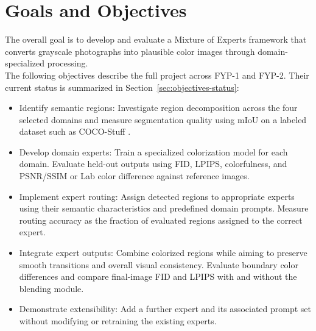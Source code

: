 \documentclass{FastFyp}
\begin{document}
\section{Goals and Objectives}
The overall goal is to develop and evaluate a Mixture of Experts framework that converts grayscale photographs into plausible color images through domain-specialized processing.\\
The following objectives describe the full project across FYP-1 and FYP-2. Their current status is summarized in Section~\ref{sec:objectives-status}:
\begin{itemize}
    \item  Identify semantic regions: Investigate region decomposition across the four selected domains and measure segmentation quality using mIoU on a labeled dataset such as COCO-Stuff \cite{caesar2018cocostuff}.
    \item Develop domain experts: Train a specialized colorization model for each domain. Evaluate held-out outputs using FID, LPIPS, colorfulness, and PSNR/SSIM or Lab color difference against reference images.
    \item Implement expert routing: Assign detected regions to appropriate experts using their semantic characteristics and predefined domain prompts. Measure routing accuracy as the fraction of evaluated regions assigned to the correct expert.
    \item Integrate expert outputs: Combine colorized regions while aiming to preserve smooth transitions and overall visual consistency. Evaluate boundary color differences and compare final-image FID and LPIPS with and without the blending module.
    \item Demonstrate extensibility: Add a further expert and its associated prompt set without modifying or retraining the existing experts.
\end{itemize}
\end{document}
